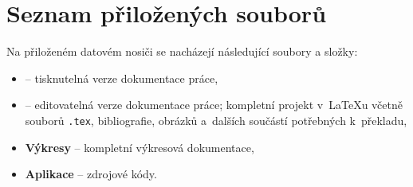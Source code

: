 
\chapter{Seznam přiložených souborů}


Na přiloženém datovém nosiči se nacházejí následující soubory a složky:

\begin{itemize}
  \item \textbf{} -- tisknutelná verze dokumentace práce,
  \item \textbf{} -- editovatelná verze dokumentace práce; kompletní projekt v~LaTeXu včetně souborů \texttt{.tex}, bibliografie, obrázků a~dalších součástí potřebných k~překladu,
  \item \textbf{Výkresy} -- kompletní výkresová dokumentace,
  \item \textbf{Aplikace} -- zdrojové kódy.
\end{itemize}

